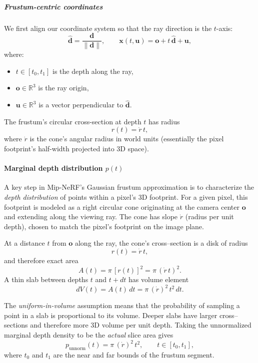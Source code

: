 \begin{enrichment}
\begin{enrichment}
    \subparagraph{Frustum-centric coordinates}  
    We first align our coordinate system so that the ray direction is the \(t\)-axis:
    \[
    \hat{\mathbf{d}} = \frac{\mathbf{d}}{\|\mathbf{d}\|}, 
    \qquad
    \mathbf{x}(t, \mathbf{u}) = \mathbf{o} + t\,\hat{\mathbf{d}} + \mathbf{u},
    \]
    where:
    \begin{itemize}
        \item \(t \in [t_0, t_1]\) is the depth along the ray,
        \item \(\mathbf{o} \in \mathbb{R}^3\) is the ray origin,
        \item \(\mathbf{u} \in \mathbb{R}^3\) is a vector perpendicular to \(\hat{\mathbf{d}}\).
    \end{itemize}
    The frustum’s circular cross-section at depth \(t\) has radius
    \[
    r(t) = \dot{r}\,t,
    \]
    where \(\dot{r}\) is the cone’s angular radius in world units (essentially the pixel footprint’s half-width projected into 3D space).
    
    \paragraph{Marginal depth distribution $p(t)$}  
    A key step in Mip-NeRF’s Gaussian frustum approximation is to characterize the \emph{depth distribution} of points within a pixel’s 3D footprint.  
    For a given pixel, this footprint is modeled as a right circular cone originating at the camera center $\mathbf{o}$ and extending along the viewing ray.  
    The cone has slope $\dot r$ (radius per unit depth), chosen to match the pixel’s footprint on the image plane.
    
    At a distance $t$ from $\mathbf{o}$ along the ray, the cone’s cross–section is a disk of radius
    \[
    r(t) = \dot r\,t,
    \]
    and therefore exact area
    \[
    A(t) = \pi \,[r(t)]^2 = \pi \,(\dot r\,t)^2.
    \]
    A thin slab between depths $t$ and $t+dt$ has volume element
    \[
    dV(t) = A(t)\,dt = \pi\,(\dot r)^2\,t^2\,dt.
    \]
    
    The \emph{uniform-in-volume} assumption means that the probability of sampling a point in a slab is proportional to its volume.  
    Deeper slabs have larger cross–sections and therefore more 3D volume per unit depth.  
    Taking the unnormalized marginal depth density to be the \emph{actual} slice area gives
    \[
    p_{\text{unnorm}}(t) = \pi\,(\dot r)^2\,t^2, \qquad t \in [t_0, t_1],
    \]
    where $t_0$ and $t_1$ are the near and far bounds of the frustum segment.
    

\end{enrichment}
\end{enrichment}
